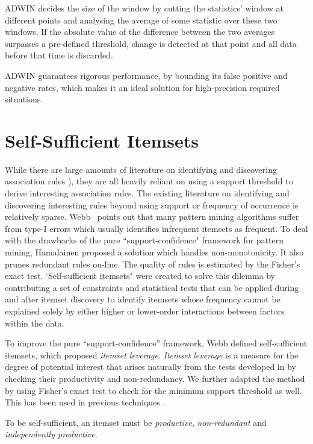 ADWIN decides the size of the window by cutting the statistics' window at different points and analysing the average of some statistic over these two windows. If the absolute value of the difference between the two averages surpasses a pre-defined threshold, change is detected at that point and all data before that time is discarded. 

ADWIN guarantees rigorous performance, by bounding its false positive and negative rates, which makes it an ideal solution for high-precision required situations.


\section{Self-Sufficient Itemsets} \label{sec:2.4}
While there are large amounts of literature on identifying and discovering association rules \cite{arm1,arm2,arm3,arm4}), they are all heavily reliant on using a support threshold to derive interesting association rules. The existing literature on identifying and discovering interesting rules beyond using support or frequency of occurrence is relatively sparse. Webb~\cite{patternwebb} points out that many pattern mining algorithms suffer from type-I errors which usually identifies infrequent itemsets as frequent. To deal with the drawbacks of the pure ``support-confidence" framework for pattern mining, Hamalainen \cite{kingfisher} proposed a solution which handles non-monotonicity. It also prunes redundant rules on-line. The quality of rules is estimated by the Fisher's exact test. `Self-sufficient itemsets" \cite{ssi} were created to solve this dilemma by contributing a set of constraints and statistical tests that can be applied during and after itemset discovery to identify itemsets whose frequency cannot be explained solely by either higher or lower-order interactions between factors within the data.

To improve the pure ``support-confidence” framework, Webb \cite{ssi} defined self-sufficient itemsets, which proposed \textit{itemset leverage}. \emph{Itemset leverage} is a measure for the degree of potential interest that arises naturally from the tests developed in \cite{ssi} by checking their productivity and non-redundancy. We further adapted the method by using Fisher's exact test to check for the minimum support threshold as well. This has been used in previous techniques \cite{kingfisher,ssi}.%

To be self-sufficient, an itemset must be \textit{productive}, \textit{non-redundant} and \textit{independently productive}.

